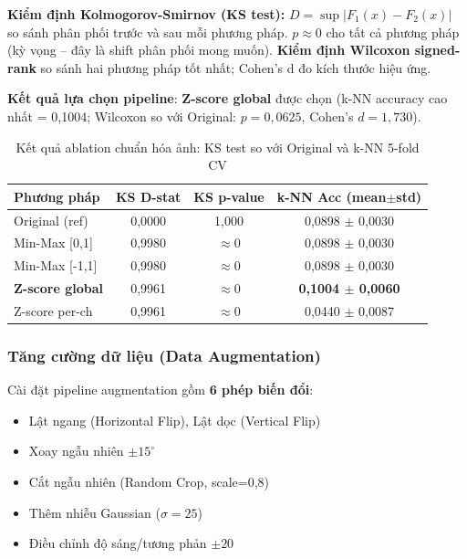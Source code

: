 \documentclass[12pt,a4paper]{article}
\let\oldtextbf\textbf
\renewcommand{\textbf}[1]{\oldtextbf{\textcolor{hcmublue}{#1}}}
\begin{document}
\textbf{Kiểm định Kolmogorov-Smirnov (KS test):} $D = \sup|F_1(x) - F_2(x)|$ so sánh phân phối trước và sau mỗi phương pháp. $p \approx 0$ cho tất cả phương pháp (kỳ vọng -- đây là shift phân phối mong muốn). \textbf{Kiểm định Wilcoxon signed-rank} so sánh hai phương pháp tốt nhất; Cohen's d đo kích thước hiệu ứng.

\textbf{Kết quả lựa chọn pipeline}: \textbf{Z-score global} được chọn (k-NN accuracy cao nhất = 0{,}1004; Wilcoxon so với Original: $p = 0{,}0625$, Cohen's $d = 1{,}730$).

\begin{table}[H]
\centering
\small
\begin{tabular}{|l|c|c|c|}
\hline
\textbf{Phương pháp} & \textbf{KS D-stat} & \textbf{KS p-value} & \textbf{k-NN Acc (mean$\pm$std)} \\ \hline
Original (ref)              & 0{,}0000 & 1{,}000       & 0{,}0898 $\pm$ 0{,}0030 \\ \hline
Min-Max {[}0,1{]}           & 0{,}9980 & $\approx 0$   & 0{,}0898 $\pm$ 0{,}0030 \\ \hline
Min-Max {[}-1,1{]}          & 0{,}9980 & $\approx 0$   & 0{,}0898 $\pm$ 0{,}0030 \\ \hline
\textbf{Z-score global}     & 0{,}9961 & $\approx 0$   & \textbf{0{,}1004 $\pm$ 0{,}0060} \\ \hline
Z-score per-ch              & 0{,}9961 & $\approx 0$   & 0{,}0440 $\pm$ 0{,}0087 \\ \hline
\end{tabular}
\caption{Kết quả ablation chuẩn hóa ảnh: KS test so với Original và k-NN 5-fold CV}
\label{tab:norm_ablation}
\end{table}

\subsubsection{Tăng cường dữ liệu (Data Augmentation)}

Cài đặt pipeline augmentation gồm \textbf{6 phép biến đổi}:
\begin{itemize}
    \item Lật ngang (Horizontal Flip), Lật dọc (Vertical Flip)
    \item Xoay ngẫu nhiên $\pm 15^{\circ}$
    \item Cắt ngẫu nhiên (Random Crop, scale=0,8)
    \item Thêm nhiễu Gaussian ($\sigma = 25$)
    \item Điều chỉnh độ sáng/tương phản $\pm 20$
\end{itemize}
\end{document}
